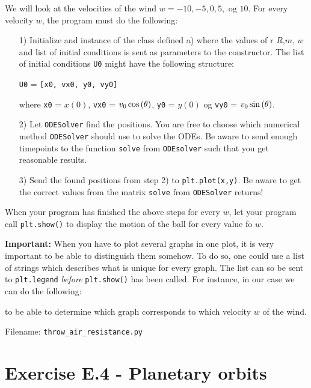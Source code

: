 \documentclass[10pt,a4paper]{article}
\begin{document}
We will look at the velocities of the wind $w = -10,-5,0,5,\text{ og }10$.
For every velocity $w$, the program must do the following:
\begin{itemize}
	\item[1)] Initialize and instance of the class defined a) where the values of r $R$,$m$, $w$ and list of initial conditions is sent as parameters to the constructor. The list of initial conditions \texttt{U0} might have the following structure:
	
	\texttt{U0} = \texttt{[x0, vx0, y0, vy0]} 
	
	where \texttt{x0} = $x(0)$, \texttt{vx0} = $v_0\cos\qty(\theta)$, \texttt{y0} = $y(0)$ og \texttt{vy0} = $v_0\sin\qty(\theta)$. 
	
	\item[2)] Let \texttt{ODESolver} find the positions. You are free to choose which numerical method \texttt{ODESolver}  should use to solve the ODEs. Be aware to send enough timepoints to the function \texttt{solve} from \texttt{ODEsolver} such that you get reasonable results. 
	
	\item[3)] Send the found positions from step 2) to \texttt{plt.plot(x,y)}. Be aware to get the correct values from the matrix \texttt{solve} from \texttt{ODESolver} returns!
\end{itemize}
When your program has finished the above steps for every $w$, let your program call \texttt{plt.show()} to display the motion of the ball for every value fo $w$. 


\textbf{Important: } When you have to plot several graphs in one plot, it is very important to be able to distinguish them somehow. To do so, one could use a list of strings which describes what is unique for every graph. The list can so be sent to \texttt{plt.legend} \textit{before} \texttt{plt.show()}  has been called. For instance, in our case we can do the following: 



to be able to determine which graph corresponds to which velocity $w$ of the wind. 

Filename: \texttt{throw\_air\_resistance.py}




\section*{Exercise E.4 - Planetary orbits}
\end{document}
